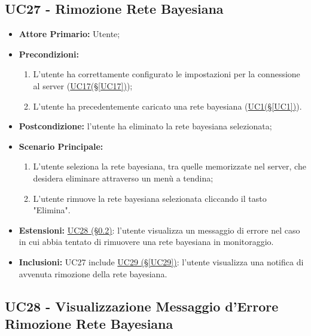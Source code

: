 \pagebreak

\subsection{UC27 - Rimozione Rete Bayesiana}\label{UC27}

\begin{itemize}
	\item \textbf{Attore Primario:} Utente;
	\item \textbf{Precondizioni:}
	\begin{enumerate}
 		\item L'utente ha correttamente configurato le impostazioni per la connessione al server (\hyperref[UC17]{UC17(§\ref*{UC17})});
 		\item L'utente ha precedentemente caricato una rete bayesiana (\hyperref[UC1]{UC1(§\ref*{UC1})}).
	\end{enumerate}
	\item \textbf{Postcondizione:} l'utente ha eliminato la rete bayesiana selezionata;
	\item \textbf{Scenario Principale:}
	\begin{enumerate}
		\item L'utente seleziona la rete bayesiana, tra quelle memorizzate nel server, che desidera eliminare attraverso un menù a tendina;
		\item L'utente rimuove la rete bayesiana selezionata cliccando il tasto "Elimina".
	\end{enumerate}
	\item \textbf{Estensioni:} \hyperref[UC28]{UC28 (§\ref*{UC28})}: l'utente visualizza un messaggio di errore nel caso in cui abbia tentato di rimuovere una rete bayesiana in monitoraggio.
	\item \textbf{Inclusioni:} UC27 include \hyperref[UC29]{UC29 (§\ref*{UC29})}: l'utente visualizza una notifica di avvenuta rimozione della rete bayesiana.
\end{itemize}

\pagebreak

\subsection{UC28 - Visualizzazione Messaggio d'Errore Rimozione Rete Bayesiana}\label{UC28}

